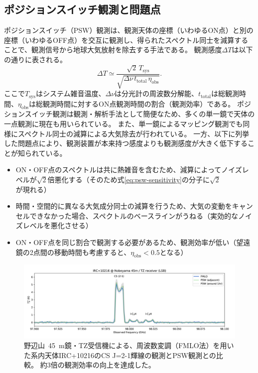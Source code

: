 \documentclass[a4paper,10pt,oneside,twocolumn,notitlepage,final]{jarticle}
\newcommand{\subrm}[1]{_{\mathrm{#1}}}
\begin{document}
\subsection{ポジションスイッチ観測と問題点}

ポジションスイッチ（PSW）観測は、観測天体の座標（いわゆるON点）と別の座標（いわゆるOFF点）を交互に観測し、得られたスペクトル同士を減算することで、観測信号から地球大気放射を除去する手法である。
観測感度$\Delta T$は以下の通りに表される。
\begin{equation}
    \Delta T
    \simeq\frac{\sqrt{2}\,T\subrm{sys}}{\sqrt{\Delta\nu\, t\subrm{total}\, \eta\subrm{obs}}}.
    \label{eq:psw-sensitivity}
\end{equation}
ここで$T\subrm{sys}$はシステム雑音温度、$\Delta\nu$は分光計の周波数分解能、$t\subrm{total}$は総観測時間、$\eta\subrm{obs}$は総観測時間に対するON点観測時間の割合（観測効率）である。
ポジションスイッチ観測は観測・解析手法として簡便なため、多くの単一鏡で天体の一点観測に現在も用いられている。
また、単一鏡によるマッピング観測でも同様にスペクトル同士の減算による大気除去が行われている。
一方、以下に列挙した問題点により、観測装置が本来持つ感度よりも観測感度が大きく低下することが知られている。

\begin{itemize}
    \item ON・OFF点のスペクトルは共に熱雑音を含むため、減算によってノイズレベルが$\sqrt{2}$倍悪化する（そのため式\ref{eq:psw-sensitivity}の分子に$\sqrt{2}$が現れる）
    \item 時間・空間的に異なる大気成分同士の減算を行うため、大気の変動をキャンセルできなかった場合、スペクトルのベースラインがうねる（実効的なノイズレベルを悪化させる）
    \item ON・OFF点を同じ割合で観測する必要があるため、観測効率が低い（望遠鏡の2点間の移動時間も考慮すると、$\eta\subrm{obs}<0.5$となる）
\end{itemize}

\begin{figure}[t]
    \centering
    \includegraphics[width=\textwidth]{figures/figure-2}
    \caption{
        野辺山~45~m鏡・TZ受信機による、周波数変調（FMLO法）を用いた系内天体IRC+10216のCS J=2-1輝線の観測とPSW観測との比較\citep{Taniguchi+20}。
        約3倍の観測効率の向上を達成した。
    }
    \label{fig:2}
\end{figure}
\end{document}
